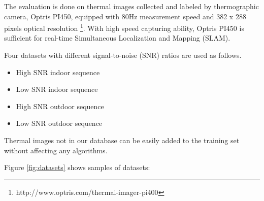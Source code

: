 The evaluation is done on thermal images
collected and labeled by thermographic camera, Optris PI450, equipped with 80Hz
measurement speed and 382 x 288 pixels optical resolution \footnote{http://www.optris.com/thermal-imager-pi400}. With high speed capturing ability, Optris PI450 is sufficient for real-time Simultaneous Localization and Mapping (SLAM).   

Four datasets with different signal-to-noise (SNR) ratios  are used as follows. 
\begin{itemize}
\item High SNR indoor sequence
\item Low SNR indoor sequence
\item High SNR outdoor sequence
\item Low SNR outdoor sequence
\end{itemize}

Thermal images not in our database can be easily added to the training set without affecting any algorithms.











Figure \ref{fig:datasets} shows samples of datasets:

